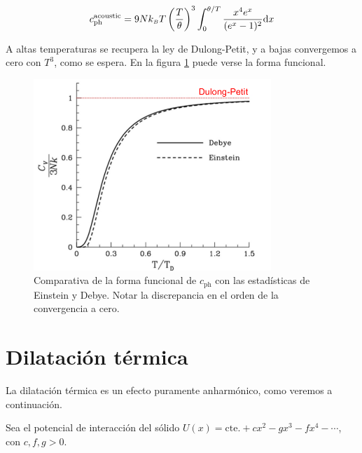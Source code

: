 \begin{equation}
  c_\text{ph}^\text{acoustic} = 9Nk_{\scriptscriptstyle{B}}  T \left( \frac{T}{\theta} \right)^3 \int_0^{\theta/T}
  \frac{x^4 e^{x}}{(e^{x}- 1)^2} \text{d}x
\end{equation}

A altas temperaturas se recupera la ley de Dulong-Petit, y a bajas
convergemos a cero con $T^3$, como se espera. En la figura
\ref{fig:cph} puede verse la forma funcional.

\begin{figure}
  \centering
  \includegraphics[width=0.8\textwidth]{figures/cph.png}
  \caption{Comparativa de la forma funcional de $c_\text{ph}$ con las
    estadísticas de Einstein y Debye. Notar la discrepancia en el
    orden de la convergencia a cero.}
  \label{fig:cph}
\end{figure}


\section{Dilatación térmica}
La dilatación térmica es un efecto puramente anharmónico, como veremos
a continuación.

Sea el potencial de interacción del sólido
$U(x) = \text{cte.} + cx^2 - gx^3 - fx^4 - \cdots$, con $c,f,g > 0$.
